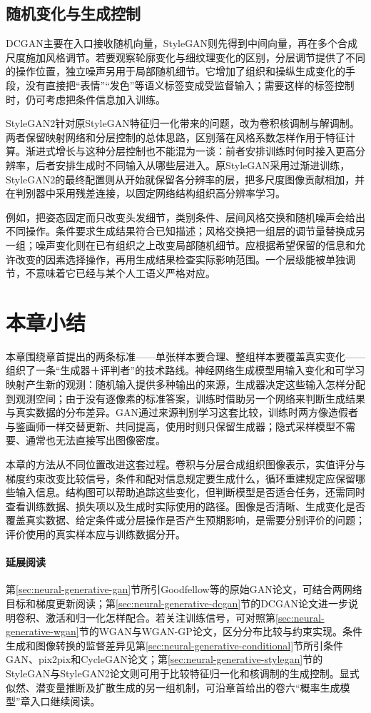\subsection{随机变化与生成控制}

DCGAN主要在入口接收随机向量，StyleGAN则先得到中间向量，再在多个合成尺度施加风格调节。若要观察轮廓变化与细纹理变化的区别，分层调节提供了不同的操作位置，独立噪声另用于局部随机细节。它增加了组织和操纵生成变化的手段，没有直接把“表情”“发色”等语义标签变成受监督输入；需要这样的标签控制时，仍可考虑把条件信息加入训练。

StyleGAN2针对原StyleGAN特征归一化带来的问题，改为卷积核调制与解调制。两者保留映射网络和分层控制的总体思路，区别落在风格系数怎样作用于特征计算。渐进式增长与这种分层控制也不能混为一谈：前者安排训练时何时接入更高分辨率，后者安排生成时不同输入从哪些层进入。原StyleGAN采用过渐进训练，StyleGAN2的最终配置则从开始就保留各分辨率的层，把多尺度图像贡献相加，并在判别器中采用残差连接，以固定网络结构组织高分辨率学习。

例如，把姿态固定而只改变头发细节，类别条件、层间风格交换和随机噪声会给出不同操作。条件要求生成结果符合已知描述；风格交换把一组层的调节量替换成另一组；噪声变化则在已有组织之上改变局部随机细节。应根据希望保留的信息和允许改变的因素选择操作，再用生成结果检查实际影响范围。一个层级能被单独调节，不意味着它已经与某个人工语义严格对应。

\section{本章小结}
\label{sec:neural-generative-summary}

本章围绕章首提出的两条标准——单张样本要合理、整组样本要覆盖真实变化——组织了一条“生成器＋评判者”的技术路线。神经网络生成模型用输入变化和可学习映射产生新的观测：随机输入提供多种输出的来源，生成器决定这些输入怎样分配到观测空间；由于没有逐像素的标准答案，训练时借助另一个网络来判断生成结果与真实数据的分布差异。GAN通过来源判别学习这套比较，训练时两方像造假者与鉴画师一样交替更新、共同提高，使用时则只保留生成器；隐式采样模型不需要、通常也无法直接写出图像密度。

本章的方法从不同位置改进这套过程。卷积与分层合成组织图像表示，实值评分与梯度约束改变比较信号，条件和配对信息规定要生成什么，循环重建规定应保留哪些输入信息。结构图可以帮助追踪这些变化，但判断模型是否适合任务，还需同时查看训练数据、损失项以及生成时实际使用的路径。图像是否清晰、生成变化是否覆盖真实数据、给定条件或分层操作是否产生预期影响，是需要分别评价的问题；评价使用的真实样本应与训练数据分开。

\paragraph{延展阅读}
第\ref{sec:neural-generative-gan}节所引Goodfellow等的原始GAN论文，可结合两网络目标和梯度更新阅读；第\ref{sec:neural-generative-dcgan}节的DCGAN论文进一步说明卷积、激活和归一化怎样配合。若关注训练信号，可对照第\ref{sec:neural-generative-wgan}节的WGAN与WGAN-GP论文，区分分布比较与约束实现。条件生成和图像转换的监督差异见第\ref{sec:neural-generative-conditional}节所引条件GAN、pix2pix和CycleGAN论文；第\ref{sec:neural-generative-stylegan}节的StyleGAN与StyleGAN2论文则可用于比较特征归一化和核调制的生成控制。显式似然、潜变量推断及扩散生成的另一组机制，可沿章首给出的卷六“概率生成模型”章入口继续阅读。

